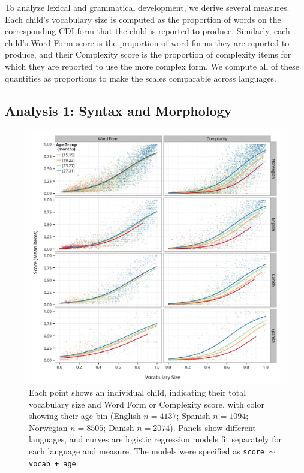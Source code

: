 \documentclass[10pt,letterpaper]{article}
\begin{document}
To analyze lexical and grammatical development, we derive several measures. Each child's vocabulary size is computed as the proportion of words on the corresponding CDI form that the child is reported to produce. Similarly, each child's Word Form score is the proportion of word forms they are reported to produce, and their Complexity score is the proportion of complexity items for which they are reported to use the more complex form. We compute all of these quantities as proportions to make the scales comparable across languages.

\subsection{Analysis 1: Syntax and Morphology}

\begin{figure}[t!]
\centering
\includegraphics[width=.72\textwidth]{plots/grammar_data_plot-1.png}
\caption{\label{fig:grammar} Each point shows an individual child, indicating their total vocabulary size and Word Form or Complexity score, with color showing their age bin (English $n=4137$; Spanish $n=1094$; Norwegian $n=8505$; Danish $n=2074$). Panels show different languages, and curves are logistic regression models fit separately for each language and measure. The models were specified as {\small{\tt{score $\sim$ vocab + age}}}.} 
\end{figure}
\end{document}
